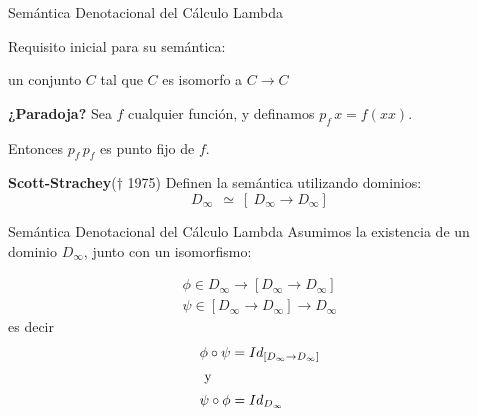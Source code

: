\documentclass[handout]{beamer}
\begin{document}
\begin{frame}{Semántica Denotacional del Cálculo Lambda}
  
Requisito inicial para su semántica: 

\medskip

un conjunto $C$ tal que $C$ es isomorfo a $C\to C$ \pause

\bigskip

\textbf{¿Paradoja?} Sea $f$ cualquier función, y definamos $p_f\, x = f (x x)$.

\medskip

Entonces $p_f\,p_f$ es punto fijo de $f$. 
\pause
\bigskip

\textbf{Scott-Strachey}($\dagger$ 1975) Definen la semántica utilizando dominios:
\[D_\infty\ \  \simeq\ [\ D_\infty \rightarrow D_\infty]\]
\end{frame}


\begin{frame}{Semántica Denotacional del Cálculo Lambda}
Asumimos la existencia de un dominio $D_{\infty}$, junto con un isomorfismo:

\begin{align*}
\phi\in D_{\infty}\rightarrow [D_{\infty}\rightarrow D_{\infty}] \\
\psi\in [D_{\infty}\rightarrow D_{\infty}]\rightarrow D_{\infty}
\end{align*}
es decir 
\begin{align*}
  \phi \circ \psi &= Id_{[D_{\infty}\rightarrow D_{\infty}]} \\
  \shortintertext{ y }
  \psi\circ\phi &= Id_{D_{\infty}} 
\end{align*}
\end{frame}
\end{document}
